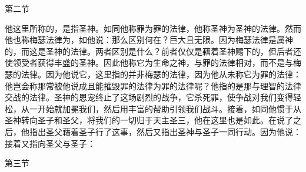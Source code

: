 第二节　\par

他这里所称的，是指圣神。如同他称罪为罪的法律，他称圣神为圣神的法律。然而他也称梅瑟法律为，如他说：那么区别何在？巨大且无限。因为梅瑟法律是属神的，而这是圣神的法律。两者区别是什么？前者仅仅是藉着圣神赐下的，但后者还使领受者获得丰盛的圣神。因此他称它为生命之神，与罪的法律相对，而不是与梅瑟的法律。因为他说它，这里指的并非梅瑟的法律，因为他从未称它为罪的法律：他岂会称那常被他说成且能摧毁罪的法律为罪的法律呢？他指的是那与理智的法律交战的法律。圣神的恩宠终止了这场剧烈的战争，它杀死罪，使争战对我们变得轻松，从一开始就加冕我们，然后用丰富的帮助引领我们战斗。接着，如同他惯于从圣神转向圣子和圣父，将我们的一切归于天主圣三，他在这里也是如此。在说了之后，他指出圣父藉着圣子行了这事，然后又指出圣神与圣子一同行动。因为他说：接着又指向圣父与圣子：\par

第三节　\par

